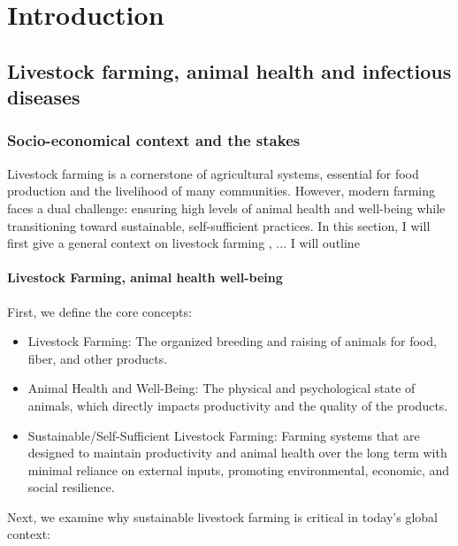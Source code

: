 \chapter{Introduction} 

\section{Livestock farming, animal health and infectious diseases}

\subsection{Socio-economical context and the stakes}

Livestock farming is a cornerstone of agricultural systems, essential for food production and the livelihood of many communities. However, modern farming faces a dual challenge: ensuring high levels of animal health and well-being while transitioning toward sustainable, self-sufficient practices. In this section, I will first give a general context on livestock farming , ...
I will outline 


\subsubsection{Livestock Farming, animal health well-being}

First, we define the core concepts:
\begin{itemize}
    \item Livestock Farming: The organized breeding and raising of animals for food, fiber, and other products.
    \item Animal Health and Well-Being: The physical and psychological state of animals, which directly impacts productivity and the quality of the products.
    \item Sustainable/Self-Sufficient Livestock Farming: Farming systems that are designed to maintain productivity and animal health over the long term with minimal reliance on external inputs, promoting environmental, economic, and social resilience.
\end{itemize}


Next, we examine why sustainable livestock farming is critical in today’s global context:

